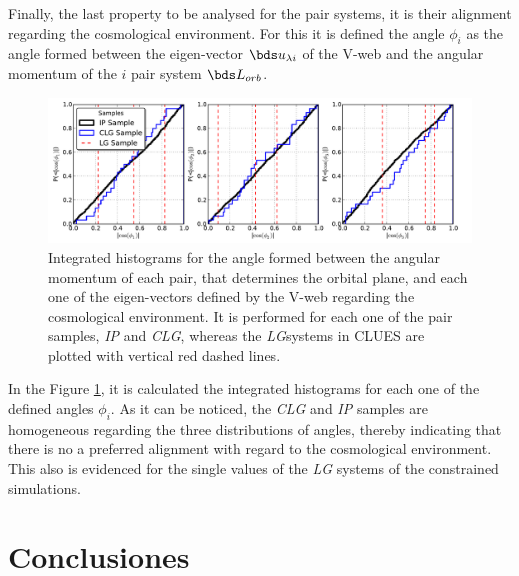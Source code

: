 Finally, the last property to be analysed  for the pair systems, it is 
their alignment regarding the cosmological environment. For this it is 
defined the angle $\phi_i$ as the angle formed between the eigen-vector 
$\bds u_{\lambda i}$ of the V-web and the angular momentum of the $i$ 
pair system $\bds L_{orb}$.


\begin{figure}[htbp]
	\centering
	\includegraphics[trim = 0mm 0mm 5mm 0mm, clip, width=1.0\textwidth]
	{./figures/4_results/CLG_Alineation.pdf}
	
	\caption{\small{Integrated histograms for the angle formed between
	the angular momentum of each pair, that determines the orbital plane,
	and each one of the eigen-vectors defined by the V-web regarding the
	cosmological environment. It is performed for each one of the pair 
	samples, \textit{IP} and \textit{CLG}, whereas the \textit{LG}systems 
	in CLUES are plotted with vertical red dashed lines.}}
	\label{fig:CLG_Alineation}
\end{figure}
	

In the Figure \ref{fig:CLG_Alineation}, it is calculated the integrated
histograms for each one of the defined angles $\phi_i$. As it can be 
noticed, the \textit{CLG} and \textit{IP} samples are homogeneous 
regarding the three distributions of angles, thereby indicating that there
is no a preferred alignment with regard to the cosmological environment.
This also is evidenced for the single values of the \textit{LG} systems of
the constrained simulations.






	
\section{Conclusiones}
\label{sec:Conclusions}


